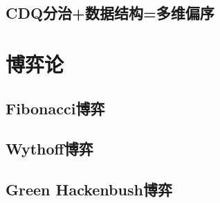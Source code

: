 \documentclass[twocolumn,a4]{article}  %
\begin{document}
		\subsection{CDQ分治+数据结构=多维偏序}
	 	 	
	
	\section{博弈论}
		\subsection{Fibonacci博弈}
	 	 	
	 	 	
		\subsection{Wythoff博弈}
	 	 	
	 	 	
		\subsection{Green Hackenbush博弈}
	 	 	
\end{document}
